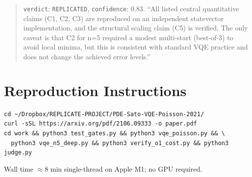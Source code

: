 \documentclass[11pt]{article}
\begin{document}
\begin{quote}\small
\texttt{verdict}: \texttt{REPLICATED}, \texttt{confidence}: 0.83.
``All listed central quantitative claims (C1, C2, C3) are reproduced on an independent
statevector implementation, and the structural scaling claim (C5) is verified. The
only caveat is that C2 for n=5 required a modest multi-start (best-of-3) to avoid
local minima, but this is consistent with standard VQE practice and does not change
the achieved error levels.''
\end{quote}

\section{Reproduction Instructions}
\begin{verbatim}
cd ~/Dropbox/REPLICATE-PROJECT/PDE-Sato-VQE-Poisson-2021/
curl -sSL https://arxiv.org/pdf/2106.09333 -o paper.pdf
cd work && python3 test_gates.py && python3 vqe_poisson.py && \
  python3 vqe_n5_deep.py && python3 verify_o1_cost.py && python3 judge.py
\end{verbatim}
Wall time $\approx$8 min single-thread on Apple M1; no GPU required.
\end{document}
